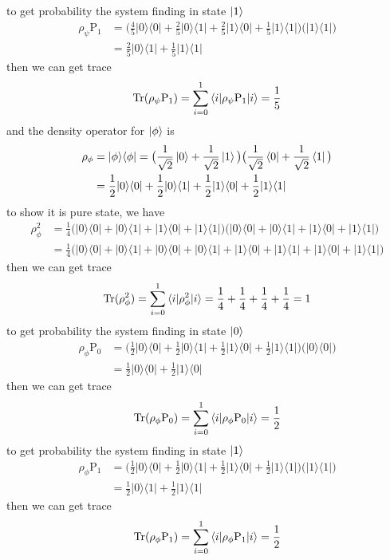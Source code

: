 \documentclass{article}
\newcommand{\op}[2]{|#1\rangle \langle#2|}
\newcommand{\sand}[3]{\braket{#1 | #2 | #3}}
\begin{document}
to get probability the system finding in state $\ket{1}$
\begin{align*}
   \rho_{\psi}\text{P}_{1} &= \big(\frac{4}{5}\op{0}{0} + \frac{2}{5}\op{0}{1} + \frac{2}{5}\op{1}{0} + \frac{1}{5}\op{1}{1}\big)\big(\op{1}{1}\big) \\
   &= \frac{2}{5}\op{0}{1} + \frac{1}{5}\op{1}{1}
\end{align*}
then we can get trace 
\begin{align*}
   \text{Tr}(\rho_{\psi}\text{P}_{1}) = \sum_{i=0}^{1} \sand{i}{\rho_{\psi}\text{P}_{1}}{i} = \frac{1}{5}
\end{align*}
and the density operator for $\ket{\phi}$ is
\begin{align*}
   \rho_{\phi} &= \op{\phi}{\phi} = \big(\frac{1}{\sqrt{2}}\ket{0} + \frac{1}{\sqrt{2}}\ket{1}\big)\big(\frac{1}{\sqrt{2}}\bra{0} + \frac{1}{\sqrt{2}}\bra{1}\big) \\
   &= \frac{1}{2}\op{0}{0} + \frac{1}{2}\op{0}{1} + \frac{1}{2}\op{1}{0} + \frac{1}{2}\op{1}{1}
\end{align*}
to show it is pure state, we have
\begin{align*}
   \rho^2_{\phi} &= \frac{1}{4}\big(\op{0}{0} + \op{0}{1} + \op{1}{0} + \op{1}{1}\big)\big(\op{0}{0} + \op{0}{1} + \op{1}{0} + \op{1}{1}\big) \\
   &= \frac{1}{4}\big( \op{0}{0} + \op{0}{1} + \op{0}{0} + \op{0}{1} + \op{1}{0} + \op{1}{1} + \op{1}{0} + \op{1}{1} \big)
\end{align*}
then we can get trace 
\begin{align*}
   \text{Tr}(\rho^2_{\phi}) = \sum_{i=0}^{1} \sand{i}{\rho^2_{\phi}}{i} = \frac{1}{4} + \frac{1}{4} + \frac{1}{4} + \frac{1}{4} = 1
\end{align*}
to get probability the system finding in state $\ket{0}$
\begin{align*}
   \rho_{\phi}\text{P}_{0} &= \big(\frac{1}{2}\op{0}{0} + \frac{1}{2}\op{0}{1} + \frac{1}{2}\op{1}{0} + \frac{1}{2}\op{1}{1}\big)\big(\op{0}{0}\big) \\
   &= \frac{1}{2}\op{0}{0} + \frac{1}{2}\op{1}{0}
\end{align*}
then we can get trace 
\begin{align*}
   \text{Tr}(\rho_{\phi}\text{P}_{0}) = \sum_{i=0}^{1} \sand{i}{\rho_{\phi}\text{P}_{0}}{i} = \frac{1}{2}
\end{align*}
to get probability the system finding in state $\ket{1}$
\begin{align*}
   \rho_{\phi}\text{P}_{1} &= \big(\frac{1}{2}\op{0}{0} + \frac{1}{2}\op{0}{1} + \frac{1}{2}\op{1}{0} + \frac{1}{2}\op{1}{1}\big)\big(\op{1}{1}\big) \\
   &= \frac{1}{2}\op{0}{1} + \frac{1}{2}\op{1}{1}
\end{align*}
then we can get trace 
\begin{align*}
   \text{Tr}(\rho_{\phi}\text{P}_{1}) = \sum_{i=0}^{1} \sand{i}{\rho_{\phi}\text{P}_{1}}{i} = \frac{1}{2}
\end{align*}
\end{document}
